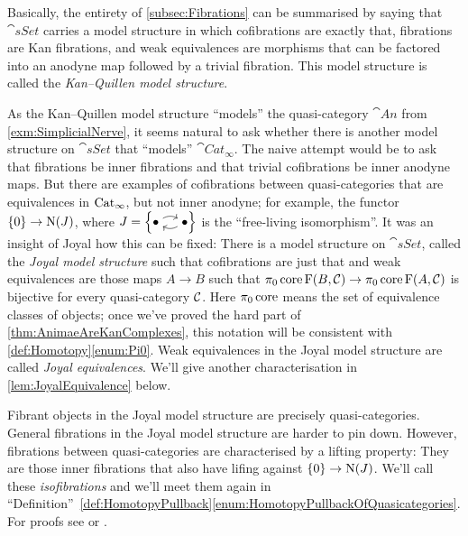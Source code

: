 \begin{exm}\label{exm:KanQuillenModelStructure}
	Basically, the entirety of \cref{subsec:Fibrations} can be summarised by saying that $\cat{sSet}$ carries a model structure in which cofibrations are exactly that, fibrations are Kan fibrations, and weak equivalences are morphisms that can be factored into an anodyne map followed by a trivial fibration. This model structure is called the \emph{Kan--Quillen model structure}.
\end{exm}
\begin{exm}\label{exm:JoyalModelStructure}
	As the Kan--Quillen model structure \enquote{models} the quasi-category $\cat{An}$ from  \cref{exm:SimplicialNerve}, it seems natural to ask whether there is another model structure on $\cat{sSet}$ that \enquote{models} $\cat{Cat}_\infty$. The naive attempt would be to ask that fibrations be inner fibrations and that trivial cofibrations be inner anodyne maps. But there are examples of cofibrations between quasi-categories that are equivalences in $\mathrm{Cat}_\infty$, but not inner anodyne; for example, the functor $\{0\}\rightarrow \operatorname{N}(J)$, where $J=\left\{\InlineJ\right\}$ is the \enquote{free-living isomorphism}. It was an insight of Joyal how this can be fixed: There is a model structure on $\cat{sSet}$, called the \emph{Joyal model structure} such that cofibrations are just that and weak equivalences are those maps $A\rightarrow B$ such that $\pi_0\operatorname{core}\operatorname{F}(B,\mathcal{C})\rightarrow \pi_0\operatorname{core}\operatorname{F}(A,\mathcal{C})$ is bijective for every quasi-category $\mathcal{C}$. Here $\pi_0\operatorname{core}$ means the set of equivalence classes of objects; once we've proved the hard part of \cref{thm:AnimaeAreKanComplexes}, this notation will be consistent with \cref{def:Homotopy}\cref{enum:Pi0}. Weak equivalences in the Joyal model structure are called \emph{Joyal equivalences}. We'll give another characterisation in \cref{lem:JoyalEquivalence} below.
	
	Fibrant objects in the Joyal model structure are precisely quasi-categories. General fibrations in the Joyal model structure are harder to pin down. However, fibrations between quasi-categories are characterised by a lifting property: They are those inner fibrations that also have lifing against $\{0\}\rightarrow\operatorname{N}(J)$. We'll call these \emph{isofibrations} and we'll meet them again in \enquote{Definition}~\cref{def:HomotopyPullback}\cref{enum:HomotopyPullbackOfQuasicategories}. For proofs see \cite[Theorem~\href{https://mat.uab.cat/~kock/crm/hocat/advanced-course/Quadern45-2.pdf\#page=153}{6.12}]{JoyalQuasiCategoriesAndApplications} or \cite[Theorem~VIII.23]{HigherCatsII}.
\end{exm}
